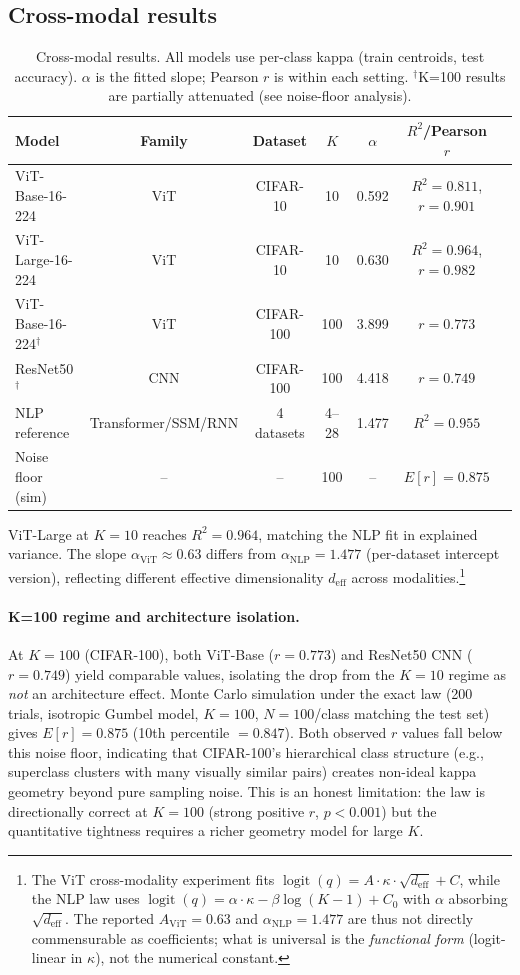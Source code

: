 \documentclass{article}
\DeclareMathOperator{\logit}{logit}
\begin{document}
\subsection{Cross-modal results}
\begin{table}[t]
\centering
\caption{Cross-modal results. All models use per-class kappa (train centroids, test accuracy). $\alpha$ is the fitted slope; Pearson $r$ is within each setting. $^\dagger$K=100 results are partially attenuated (see noise-floor analysis).}
\label{tab:vit}
\small
\begin{tabular}{lcccccc}
\toprule
Model & Family & Dataset & $K$ & $\alpha$ & $R^2$/Pearson $r$ \\
\midrule
ViT-Base-16-224     & ViT  & CIFAR-10  & 10  & 0.592 & $R^2=0.811$, $r=0.901$ \\
ViT-Large-16-224    & ViT  & CIFAR-10  & 10  & 0.630 & $R^2=0.964$, $r=0.982$ \\
ViT-Base-16-224$^\dagger$  & ViT  & CIFAR-100 & 100 & 3.899 & $r=0.773$ \\
ResNet50$^\dagger$           & CNN  & CIFAR-100 & 100 & 4.418 & $r=0.749$ \\
\midrule
NLP reference       & Transformer/SSM/RNN & 4 datasets & 4--28 & 1.477 & $R^2=0.955$ \\
Noise floor (sim)   & -- & -- & 100 & -- & $E[r]=0.875$ \\
\bottomrule
\end{tabular}
\end{table}

ViT-Large at $K=10$ reaches $R^2=0.964$, matching the NLP fit in explained variance. The slope $\alpha_{\mathrm{ViT}}\approx0.63$ differs from $\alpha_{\mathrm{NLP}}=1.477$ (per-dataset intercept version), reflecting different effective dimensionality $d_\mathrm{eff}$ across modalities.\footnote{The ViT cross-modality experiment fits $\logit(q)=A\cdot\kappa\cdot\sqrt{d_\mathrm{eff}}+C$, while the NLP law uses $\logit(q)=\alpha\cdot\kappa-\beta\log(K-1)+C_0$ with $\alpha$ absorbing $\sqrt{d_\mathrm{eff}}$. The reported $A_{\mathrm{ViT}}=0.63$ and $\alpha_{\mathrm{NLP}}=1.477$ are thus not directly commensurable as coefficients; what is universal is the \emph{functional form} (logit-linear in $\kappa$), not the numerical constant.}

\paragraph{K=100 regime and architecture isolation.}
At $K=100$ (CIFAR-100), both ViT-Base ($r=0.773$) and ResNet50 CNN ($r=0.749$) yield comparable values, isolating the drop from the $K=10$ regime as \emph{not} an architecture effect. Monte Carlo simulation under the exact law (200 trials, isotropic Gumbel model, $K=100$, $N=100$/class matching the test set) gives $E[r]=0.875$ (10th percentile $=0.847$). Both observed $r$ values fall below this noise floor, indicating that CIFAR-100's hierarchical class structure (e.g., superclass clusters with many visually similar pairs) creates non-ideal kappa geometry beyond pure sampling noise. This is an honest limitation: the law is directionally correct at $K=100$ (strong positive $r$, $p<0.001$) but the quantitative tightness requires a richer geometry model for large $K$.
\end{document}
